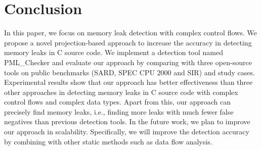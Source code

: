 \section{Conclusion}\label{sec:conclusion}

In this paper, we focus on memory leak detection with complex control flows. We propose a novel projection-based approach to increase the accuracy in detecting memory leaks in C source code. We implement a detection tool named PML\_Checker and evaluate our approach by comparing with three open-source tools on public benchmarks (SARD, SPEC CPU $2000$ and SIR) and study cases. Experimental results show that our approach has better effectiveness than three other approaches in detecting memory leaks in C source code with complex control flows and complex data types. Apart from this, our approach can precisely find memory leaks, i.e., finding more leaks with much fewer false negatives than previous detection tools. In the future work, we plan to improve our approach in scalability. Specifically, we will improve the detection accuracy by combining with other static methods such as data flow analysis.
